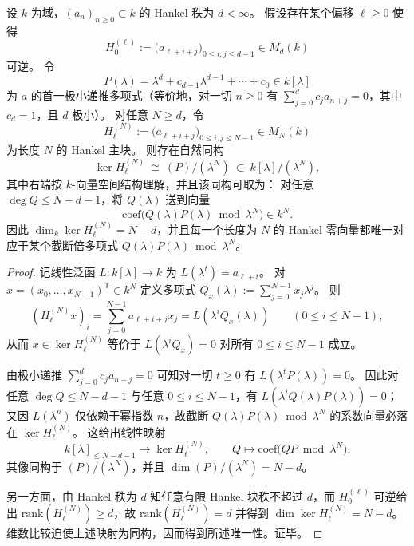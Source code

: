 \begin{theorem}\label{thm:xi-hankel-nullspace-truncated-ideal-structure}
设 \(k\) 为域，\((a_n)_{n\ge 0}\subset k\) 的 Hankel 秩为 \(d<\infty\)。
假设存在某个偏移 \(\ell\ge 0\) 使得
\[
H_0^{(\ell)}:=\bigl(a_{\ell+i+j}\bigr)_{0\le i,j\le d-1}\in M_d(k)
\]
可逆。
令
\[
P(\lambda)=\lambda^{d}+c_{d-1}\lambda^{d-1}+\cdots+c_0\in k[\lambda]
\]
为 \(a\) 的首一极小递推多项式（等价地，对一切 \(n\ge 0\) 有 \(\sum_{j=0}^{d}c_j a_{n+j}=0\)，其中 \(c_d=1\)，且 \(d\) 极小）。
对任意 \(N\ge d\)，令
\[
H^{(N)}_{\ell}:=\bigl(a_{\ell+i+j}\bigr)_{0\le i,j\le N-1}\in M_N(k)
\]
为长度 \(N\) 的 Hankel 主块。
则存在自然同构
\[
\ker H^{(N)}_{\ell}\ \cong\ (P)\big/(\lambda^{N})\ \subset\ k[\lambda]/(\lambda^{N}),
\]
其中右端按 \(k\)-向量空间结构理解，并且该同构可取为：
对任意 \(\deg Q\le N-d-1\)，将 \(Q(\lambda)\) 送到向量
\[
\mathrm{coef}\bigl(Q(\lambda)P(\lambda)\bmod \lambda^{N}\bigr)\in k^{N}.
\]
因此 \(\dim_k\ker H^{(N)}_{\ell}=N-d\)，并且每一个长度为 \(N\) 的 Hankel 零向量都唯一对应于某个截断倍多项式 \(Q(\lambda)P(\lambda)\bmod\lambda^{N}\)。
\end{theorem}
\begin{proof}
记线性泛函 \(L:k[\lambda]\to k\) 为 \(L(\lambda^{t})=a_{\ell+t}\)。
对 \(x=(x_0,\dots,x_{N-1})^{\mathsf T}\in k^N\) 定义多项式
\(
Q_x(\lambda):=\sum_{j=0}^{N-1}x_j\lambda^j
\)。
则
\[
(H^{(N)}_{\ell}x)_i=\sum_{j=0}^{N-1}a_{\ell+i+j}x_j=L(\lambda^{i}Q_x(\lambda))
\qquad(0\le i\le N-1),
\]
从而 \(x\in\ker H^{(N)}_{\ell}\) 等价于 \(L(\lambda^{i}Q_x)=0\) 对所有 \(0\le i\le N-1\) 成立。
\par
由极小递推 \(\sum_{j=0}^{d}c_j a_{n+j}=0\) 可知对一切 \(t\ge 0\) 有 \(L(\lambda^{t}P(\lambda))=0\)。
因此对任意 \(\deg Q\le N-d-1\) 与任意 \(0\le i\le N-1\)，有
\(
L(\lambda^{i}Q(\lambda)P(\lambda))=0
\)；
又因 \(L(\lambda^{n})\) 仅依赖于幂指数 \(n\)，故截断 \(Q(\lambda)P(\lambda)\bmod \lambda^{N}\) 的系数向量必落在 \(\ker H^{(N)}_{\ell}\)。
这给出线性映射
\[
k[\lambda]_{\le N-d-1}\longrightarrow \ker H^{(N)}_{\ell},
\qquad
Q\longmapsto \mathrm{coef}\bigl(QP\bmod \lambda^N\bigr).
\]
其像同构于 \((P)/(\lambda^N)\)，并且 \(\dim (P)/(\lambda^N)=N-d\)。
\par
另一方面，由 Hankel 秩为 \(d\) 知任意有限 Hankel 块秩不超过 \(d\)，而 \(H_0^{(\ell)}\) 可逆给出 \(\mathrm{rank}(H^{(N)}_{\ell})\ge d\)，故 \(\mathrm{rank}(H^{(N)}_{\ell})=d\) 并得到
\(
\dim\ker H^{(N)}_{\ell}=N-d
\)。
维数比较迫使上述映射为同构，因而得到所述唯一性。证毕。
\end{proof}

